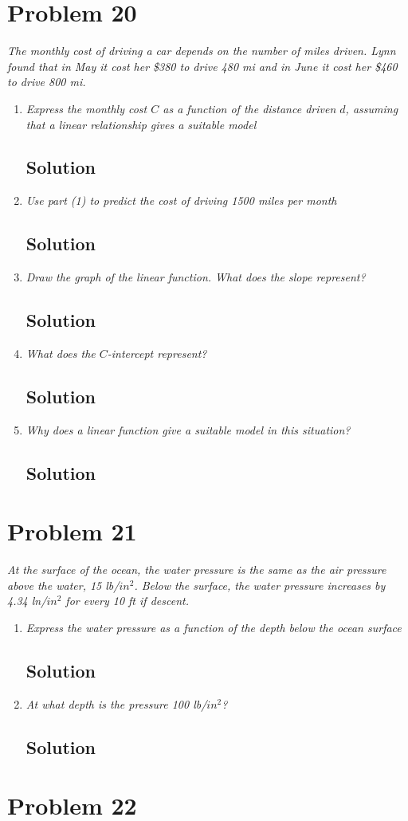 \documentclass[11pt]{article}
\newcommand{\soln}{\subsection*}
\newcommand{\qn}{\textit}
\begin{document}
\section*{Problem 20}

\qn{The monthly cost of driving a car depends on the number of miles driven. Lynn found that in May it cost her \$380 to drive 480 mi and in June it cost her \$460 to drive 800 mi.}

\begin{enumerate}
	\item \qn{Express the monthly cost $C$ as a function of the distance driven $d$, assuming that a linear relationship gives a suitable model}
	\soln{Solution}
	
	\item \qn{Use part (1) to predict the cost of driving 1500 miles per month}
	\soln{Solution}
	
	\item \qn{Draw the graph of the linear function. What does the slope represent?}
	\soln{Solution}
	
	\item \qn{What does the $C$-intercept represent?}
	\soln{Solution}
	
	\item \qn{Why does a linear function give a suitable model in this situation?}
	\soln{Solution}
\end{enumerate}

\section*{Problem 21}

\qn{At the surface of the ocean, the water pressure is the same as the air pressure above the water, 15 lb/$in^2$. Below the surface, the water pressure increases by 4.34 ln/$in^2$ for every 10 ft if descent.}

\begin{enumerate}
	\item \qn{Express the water pressure as a function of the depth below the ocean surface}
	\soln{Solution}
	
	\item \qn{At what depth is the pressure 100 lb/$in^2$?}
	\soln{Solution}
\end{enumerate}

\section*{Problem 22}
\end{document}
